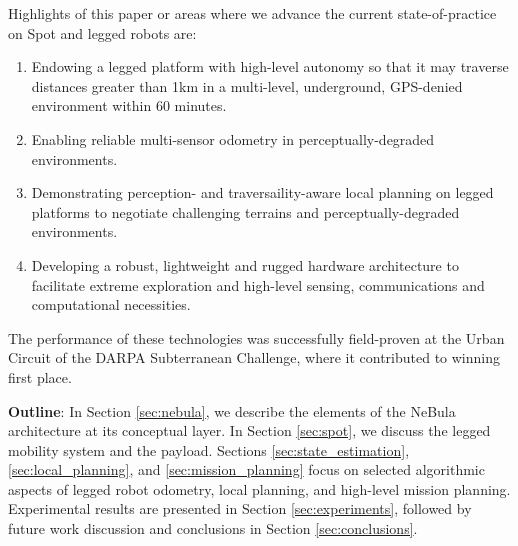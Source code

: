 \documentclass[letterpaper, 10pt, conference]{ieeeconf}      %
\newcommand{\ph}[1]{{\textbf{#1}:}} %
\newcommand{\rev}[1]{{\color{blue} #1 }} %
\begin{document}
Highlights of this paper or areas where we \rev{advance}the current state-of-practice on Spot \rev{and legged robots}are:
\begin{enumerate}
    \item \rev{Endowing a legged platform with high-level autonomy so that it may traverse} %
    distances greater than 1km in a multi-level, underground, GPS-denied environment \rev{within}
    60 minutes. 
    \item Enabling reliable multi-sensor odometry in perceptually-degraded environments.
    \item Demonstrating \rev{perception- and traversaility-aware}local planning on legged platforms to negotiate challenging terrains 
    \rev{and perceptually-degraded environments.}
    \item Developing a robust, lightweight and rugged hardware architecture to facilitate extreme exploration and high-level sensing, communications and computational necessities.
\end{enumerate}

\rev{The performance of these technologies was successfully field-proven at the Urban Circuit of the DARPA Subterranean Challenge, where it contributed to winning first place.}

\ph{Outline}
In Section \ref{sec:nebula}, we describe the elements of the NeBula \rev{architecture}at its \rev{conceptual}layer. 
In Section \ref{sec:spot}, we discuss the \rev{legged mobility system}and the payload. Sections \ref{sec:state_estimation}, \ref{sec:local_planning}, and \ref{sec:mission_planning} focus on \rev{selected}algorithmic aspects of legged robot odometry, local planning, and high-level mission planning. 
Experimental results are presented in Section \ref{sec:experiments}, followed by future work discussion and conclusions in Section \ref{sec:conclusions}.

\end{document}
